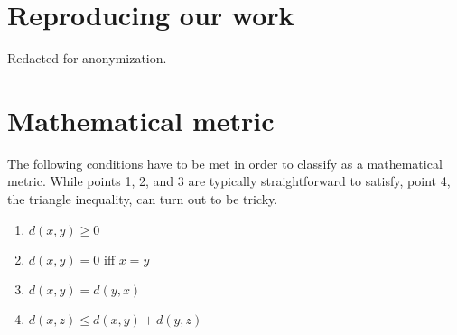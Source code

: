 \appendix

\section{Reproducing our work}
Redacted for anonymization.

\section{Mathematical metric}
\label{sec:metric}
The following conditions have to be met in order to classify as a mathematical
metric.  While points 1, 2, and 3 are typically straightforward to satisfy,
point 4, the triangle inequality, can turn out to be tricky.
\begin{enumerate}
	\item $d(x, y) \geq 0$
	\item $d(x, y) = 0$ iff $x = y$
	\item $d(x, y) = d(y, x)$
	\item $d(x, z) \leq d(x, y) + d(y, z)$
\end{enumerate}

